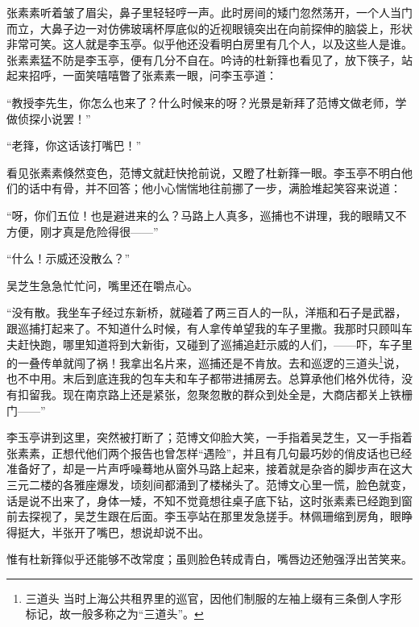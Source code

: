\par 张素素听着皱了眉尖，鼻子里轻轻哼一声。此时房间的矮门忽然荡开，一个人当门而立，大鼻子边一对仿佛玻璃杯厚底似的近视眼镜突出在向前探伸的脑袋上，形状非常可笑。这人就是李玉亭。似乎他还没看明白房里有几个人，以及这些人是谁。张素素猛不防是李玉亭，便有几分不自在。吟诗的杜新箨也看见了，放下筷子，站起来招呼，一面笑嘻嘻瞥了张素素一眼，问李玉亭道：
\par “教授李先生，你怎么也来了？什么时候来的呀？光景是新拜了范博文做老师，学做侦探小说罢！”
\par “老箨，你这话该打嘴巴！”
\par 看见张素素倏然变色，范博文就赶快抢前说，又瞪了杜新箨一眼。李玉亭不明白他们的话中有骨，并不回答；他小心惴惴地往前挪了一步，满脸堆起笑容来说道：
\par “呀，你们五位！也是避进来的么？马路上人真多，巡捕也不讲理，我的眼睛又不方便，刚才真是危险得很——”
\par “什么！示威还没散么？”
\par 吴芝生急急忙忙问，嘴里还在嚼点心。
\par “没有散。我坐车子经过东新桥，就碰着了两三百人的一队，洋瓶和石子是武器，跟巡捕打起来了。不知道什么时候，有人拿传单望我的车子里撒。我那时只顾叫车夫赶快跑，哪里知道将到大新街，又碰到了巡捕追赶示威的人们，——吓，车子里的一叠传单就闯了祸！我拿出名片来，巡捕还是不肯放。去和巡逻的三道头\footnote{三道头 当时上海公共租界里的巡官，因他们制服的左袖上缀有三条倒人字形标记，故一般多称之为“三道头”。}说，也不中用。末后到底连我的包车夫和车子都带进捕房去。总算承他们格外优待，没有扣留我。现在南京路上还是紧张，忽聚忽散的群众到处全是，大商店都关上铁栅门——”
\par 李玉亭讲到这里，突然被打断了；范博文仰脸大笑，一手指着吴芝生，又一手指着张素素，正想代他们两个报告也曾怎样“遇险”，并且有几句最巧妙的俏皮话也已经准备好了，却是一片声呼噪蓦地从窗外马路上起来，接着就是杂沓的脚步声在这大三元二楼的各雅座爆发，顷刻间都涌到了楼梯头了。范博文心里一慌，脸色就变，话是说不出来了，身体一矮，不知不觉竟想往桌子底下钻，这时张素素已经跑到窗前去探视了，吴芝生跟在后面。李玉亭站在那里发急搓手。林佩珊缩到房角，眼睁得挺大，半张开了嘴巴，想说却说不出。
\par 惟有杜新箨似乎还能够不改常度；虽则脸色转成青白，嘴唇边还勉强浮出苦笑来。
